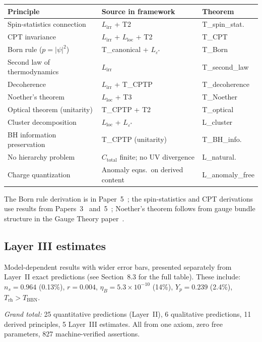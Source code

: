 \documentclass[11pt]{article}
\begin{document}
\smallskip
\begin{center}
\small
\begin{tabular}{lll}
\toprule
\textbf{Principle} & \textbf{Source in framework} & \textbf{Theorem} \\
\midrule
Spin-statistics connection & $L_{\mathrm{irr}}$ + T2 & T\_spin\_stat. \\
CPT invariance & $L_{\mathrm{irr}}$ + $L_{\mathrm{loc}}$ + T2 & T\_CPT \\
Born rule ($p = |\psi|^2$) & T\_canonical + $L_{\varepsilon^*}$ & T\_Born \\
Second law of thermodynamics & $L_{\mathrm{irr}}$ & T\_second\_law \\
Decoherence & $L_{\mathrm{irr}}$ + T\_CPTP & T\_decoherence \\
Noether's theorem & $L_{\mathrm{loc}}$ + T3 & T\_Noether \\
Optical theorem (unitarity) & T\_CPTP + T2 & T\_optical \\
Cluster decomposition & $L_{\mathrm{loc}}$ + $L_{\varepsilon^*}$ & L\_cluster \\
BH information preservation & T\_CPTP (unitarity) & T\_BH\_info. \\
No hierarchy problem & $C_{\mathrm{total}}$ finite; no UV divergence & L\_natural. \\
Charge quantization & Anomaly eqns.\ on derived content & L\_anomaly\_free \\
\bottomrule
\end{tabular}
\end{center}
\smallskip

The Born rule derivation is in Paper~5~\cite{P5}; the spin-statistics and CPT derivations use results from Papers~3~\cite{P3} and~5~\cite{P5}; Noether's theorem follows from gauge bundle structure in the Gauge Theory paper~\cite{PGT}.


\subsection{Layer III estimates}

Model-dependent results with wider error bars, presented separately from Layer~II exact predictions (see Section~8.3 for the full table).  These include: $n_s = 0.964$ (0.13\%), $r = 0.004$, $\eta_B = 5.3\times 10^{-10}$ (14\%), $Y_p = 0.239$ (2.4\%), $T_{\mathrm{rh}} > T_{\mathrm{BBN}}$.

\medskip
\noindent\textit{Grand total:} 25 quantitative predictions (Layer~II), 6 qualitative predictions, 11 derived principles, 5 Layer~III estimates.  All from one axiom, zero free parameters, 827 machine-verified assertions.
\end{document}
